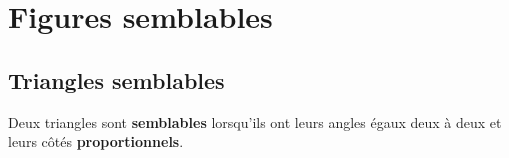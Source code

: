 \documentclass[main.tex]{subfiles}
\begin{document}
 
\cleardoublepage 
{}  
\pagestyle{scrheadings} %
\onehalfspacing 
\setcounter{chapter}{5}
\chapter{Figures semblables}

\section{Triangles semblables}



\begin{definition} Deux triangles sont \textbf{semblables} lorsqu'ils ont leurs angles égaux deux à deux et leurs côtés \textbf{proportionnels}. 
\end{definition}
\end{document}

